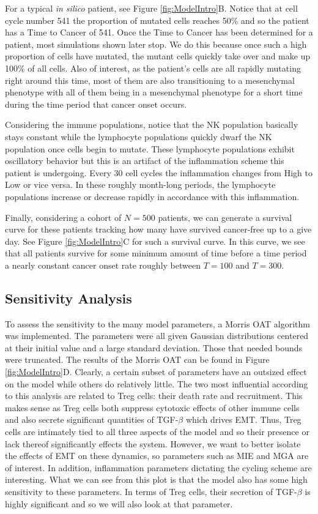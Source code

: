 \documentclass{article}
\begin{document}
For a typical {\it in silico} patient, see Figure \ref{fig:ModelIntro}B.
Notice that at cell cycle number 541 the proportion of mutated cells reaches 50\% and so the patient has a Time to Cancer of 541.
Once the Time to Cancer has been determined for a patient, most simulations shown later stop.
We do this because once such a high proportion of cells have mutated, the mutant cells quickly take over and make up 100\% of all cells.
Also of interest, as the patient's cells are all rapidly mutating right around this time, most of them are also transitioning to a mesenchymal phenotype with all of them being in a mesenchymal phenotype for a short time during the time period that cancer onset occurs.

Considering the immune populations, notice that the NK population basically stays constant while the lymphocyte populations quickly dwarf the NK population once cells begin to mutate.
These lymphocyte populations exhibit oscillatory behavior but this is an artifact of the inflammation scheme this patient is undergoing.
Every 30 cell cycles the inflammation changes from High to Low or vice versa.
In these roughly month-long periods, the lymphocyte populations increase or decrease rapidly in accordance with this inflammation.

Finally, considering a cohort of $N=500$ patients, we can generate a survival curve for these patients tracking how many have survived cancer-free up to a give day.
See Figure \ref{fig:ModelIntro}C for such a survival curve.
In this curve, we see that all patients survive for some minimum amount of time before a time period a nearly constant cancer onset rate roughly between $T = 100$ and $T = 300$.

\subsection{Sensitivity Analysis}\label{SensAnalysis}
To assess the sensitivity to the many model parameters, a Morris OAT algorithm was implemented.
The parameters were all given Gaussian distributions centered at their initial value and a large standard deviation.
Those that needed bounds were truncated.
The results of the Morris OAT can be found in Figure \ref{fig:ModelIntro}D.
Clearly, a certain subset of parameters have an outsized effect on the model while others do relatively little.
The two most influential according to this analysis are related to Treg cells: their death rate and recruitment.
This makes sense as Treg cells both suppress cytotoxic effects of other immune cells and also secrete significant quantities of TGF-$\beta$ which drives EMT.
Thus, Treg cells are intimately tied to all three aspects of the model and so their presence or lack thereof significantly effects the system.
However, we want to better isolate the effects of EMT on these dynamics, so parameters such as MIE and MGA are of interest.
In addition, inflammation parameters dictating the cycling scheme are interesting.
What we can see from this plot is that the model also has some high sensitivity to these parameters.
In terms of Treg cells, their secretion of TGF-$\beta$ is highly significant and so we will also look at that parameter.
\end{document}
